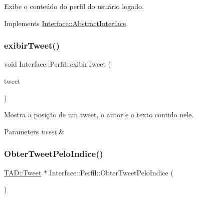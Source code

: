 Exibe o conteúdo do perfil do usuário logado. 



Implements \hyperlink{class_interface_1_1_abstract_interface_af1a45726ea636cdbf1cf2d7daa5708be}{Interface\+::\+Abstract\+Interface}.

\mbox{\label{class_interface_1_1_perfil_af925753b09f7c38e8290af6e827ab9c4}} 
\subsubsection{\texorpdfstring{exibir\+Tweet()}{exibirTweet()}}
{\footnotesize\ttfamily void Interface\+::\+Perfil\+::exibir\+Tweet (\begin{DoxyParamCaption}\item[{\hyperlink{class_t_a_d_1_1_tweet}{T\+A\+D\+::\+Tweet}}]{tweet }\end{DoxyParamCaption})\hspace{0.3cm}{\ttfamily [private]}}



Mostra a posição de um tweet, o autor e o texto contido nele. 


\begin{DoxyParams}{Parameters}
{\em tweet} & \\
\hline
\end{DoxyParams}
\mbox{\label{class_interface_1_1_perfil_a93159741b49f91350a065313fc0fede1}} 
\subsubsection{\texorpdfstring{Obter\+Tweet\+Pelo\+Indice()}{ObterTweetPeloIndice()}}
{\footnotesize\ttfamily \hyperlink{class_t_a_d_1_1_tweet}{T\+A\+D\+::\+Tweet} $\ast$ Interface\+::\+Perfil\+::\+Obter\+Tweet\+Pelo\+Indice (\begin{DoxyParamCaption}{ }\end{DoxyParamCaption})\hspace{0.3cm}{\ttfamily [private]}}



